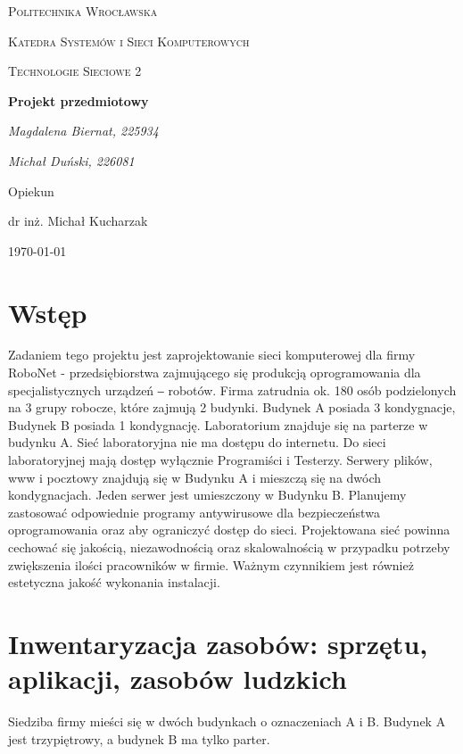 \documentclass{article}
\begin{document}
	\begin{titlepage}
		\centering
		{\scshape\LARGE Politechnika Wrocławska \par}
		{\scshape\Large Katedra Systemów i Sieci Komputerowych \par}
		
		\vspace{1cm}
		{\scshape\Large Technologie Sieciowe 2\par}
		\vspace{5cm}
		{\huge\bfseries Projekt przedmiotowy\par}
		\vspace{5cm}
		{\Large\itshape Magdalena Biernat, 225934\par}
		{\Large\itshape Michał Duński, 226081\par}
		\vfill
		Opiekun\par
		dr inż. Michał Kucharzak 
		
		\vfill
		{\large \today\par}
	\end{titlepage}
	\newpage
	\section{Wstęp}
	 Zadaniem tego projektu jest zaprojektowanie sieci komputerowej dla firmy RoboNet - przedsiębiorstwa zajmującego się produkcją oprogramowania dla specjalistycznych urządzeń ‒ robotów. Firma zatrudnia ok. 180 osób podzielonych na 3 grupy robocze, które zajmują 2 budynki. Budynek A posiada 3 kondygnacje, Budynek B posiada 1 kondygnację. Laboratorium znajduje się na parterze w budynku A. Sieć laboratoryjna nie ma dostępu do internetu. Do sieci laboratoryjnej mają dostęp wyłącznie Programiści i Testerzy. Serwery plików, www i pocztowy znajdują się w Budynku A i mieszczą się na dwóch kondygnacjach. Jeden serwer jest umieszczony w Budynku B.\newline
	 \noindent
	 \newline
Planujemy zastosować odpowiednie programy antywirusowe dla bezpieczeństwa oprogramowania oraz aby ograniczyć dostęp do sieci.
\newline
\noindent
\newline
	Projektowana sieć powinna cechować się jakością, niezawodnością oraz skalowalnością w przypadku potrzeby zwiększenia ilości pracowników w firmie. Ważnym czynnikiem jest również estetyczna jakość wykonania instalacji.
\newpage
\section{Inwentaryzacja zasobów: sprzętu, aplikacji, zasobów ludzkich}
Siedziba firmy mieści się w dwóch budynkach o oznaczeniach A i B. Budynek A jest trzypiętrowy, a budynek B ma tylko parter. 
\end{document}
